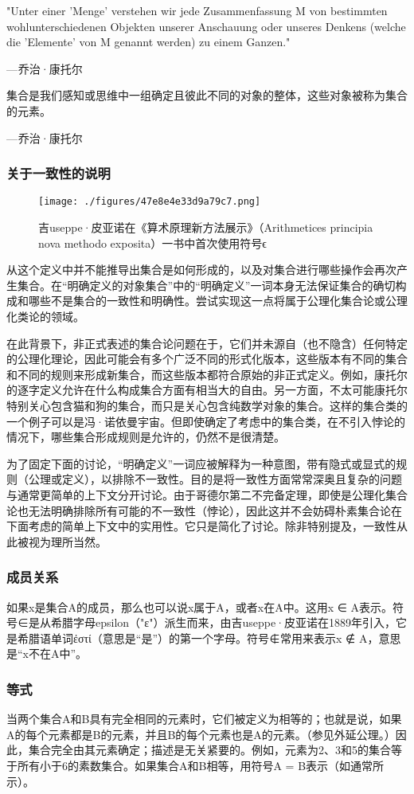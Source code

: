 "Unter einer 'Menge' verstehen wir jede Zusammenfassung M von bestimmten wohlunterschiedenen Objekten unserer Anschauung oder unseres Denkens (welche die 'Elemente' von M genannt werden) zu einem Ganzen."

— 乔治·康托尔

集合是我们感知或思维中一组确定且彼此不同的对象的整体，这些对象被称为集合的元素。

— 乔治·康托尔
\subsubsection{关于一致性的说明}  
\begin{figure}[ht]
\centering
\texttt{[image: ./figures/47e8e4e33d9a79c7.png]}
\caption{吉useppe·皮亚诺在《算术原理新方法展示》（Arithmetices principia nova methodo exposita）一书中首次使用符号ϵ} \label{fig_PSJHL_2}
\end{figure}
从这个定义中并不能推导出集合是如何形成的，以及对集合进行哪些操作会再次产生集合。在“明确定义的对象集合”中的“明确定义”一词本身无法保证集合的确切构成和哪些不是集合的一致性和明确性。尝试实现这一点将属于公理化集合论或公理化类论的领域。

在此背景下，非正式表述的集合论问题在于，它们并未源自（也不隐含）任何特定的公理化理论，因此可能会有多个广泛不同的形式化版本，这些版本有不同的集合和不同的规则来形成新集合，而这些版本都符合原始的非正式定义。例如，康托尔的逐字定义允许在什么构成集合方面有相当大的自由。另一方面，不太可能康托尔特别关心包含猫和狗的集合，而只是关心包含纯数学对象的集合。这样的集合类的一个例子可以是冯·诺依曼宇宙。但即使确定了考虑中的集合类，在不引入悖论的情况下，哪些集合形成规则是允许的，仍然不是很清楚。

为了固定下面的讨论，“明确定义”一词应被解释为一种意图，带有隐式或显式的规则（公理或定义），以排除不一致性。目的是将一致性方面常常深奥且复杂的问题与通常更简单的上下文分开讨论。由于哥德尔第二不完备定理，即使是公理化集合论也无法明确排除所有可能的不一致性（悖论），因此这并不会妨碍朴素集合论在下面考虑的简单上下文中的实用性。它只是简化了讨论。除非特别提及，一致性从此被视为理所当然。
\subsubsection{成员关系} 
如果x是集合A的成员，那么也可以说x属于A，或者x在A中。这用x ∈ A表示。符号∈是从希腊字母epsilon（"ε"）派生而来，由吉useppe·皮亚诺在1889年引入，它是希腊语单词ἐστί（意思是“是”）的第一个字母。符号∉常用来表示x ∉ A，意思是“x不在A中”。
\subsubsection{等式}  
当两个集合A和B具有完全相同的元素时，它们被定义为相等的；也就是说，如果A的每个元素都是B的元素，并且B的每个元素也是A的元素。（参见外延公理。）因此，集合完全由其元素确定；描述是无关紧要的。例如，元素为2、3和5的集合等于所有小于6的素数集合。如果集合A和B相等，用符号A = B表示（如通常所示）。
